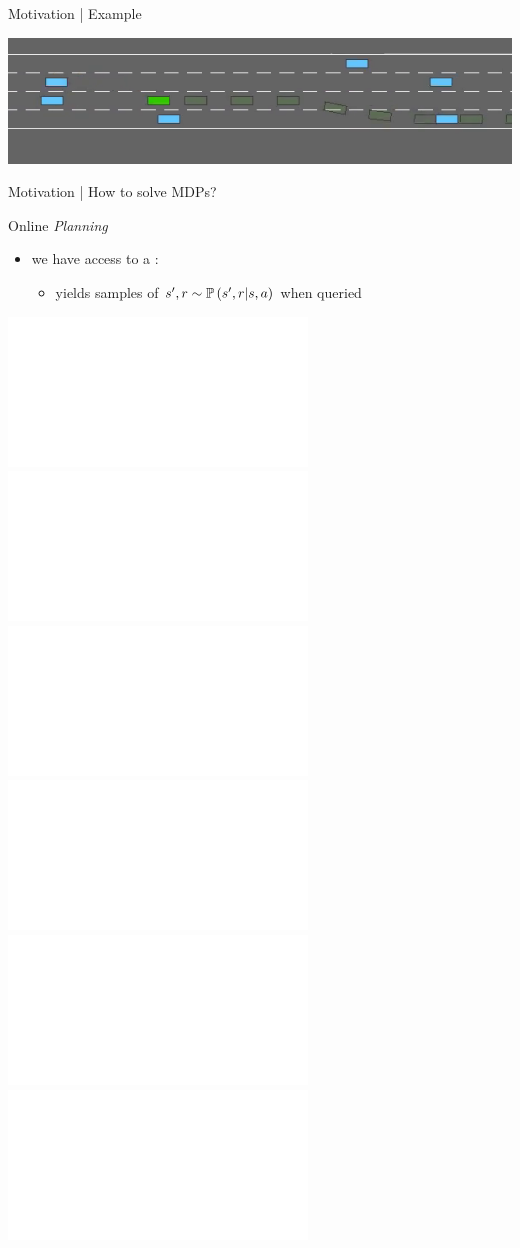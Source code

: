\documentclass{beamer}
\newcommand{\vcenteredinclude}[2]{\begingroup
\setbox0=\hbox{}%
\parbox{\wd0}{\box0}\endgroup}
\begin{document}
\begin{frame}{Motivation | Example}
\begin{center}
    \includegraphics[width=\linewidth]{img/highway-env}
\end{center}
\end{frame}

\begin{frame}{Motivation | How to solve MDPs?}
\begin{exampleblock}{Online \emph{Planning}}
\begin{itemize}
    \item we have access to a : 
    \begin{itemize}
        \item[\incarrow] yields samples of $s', r \sim \mathbb{P}\left(s',r|s,a\right)$ when queried
    \end{itemize}
\end{itemize}
\begin{center}
    \includegraphics<1>[trim=0 25 0 50,clip, width=0.7\linewidth]{img/diagram2.pdf}
    \includegraphics<2>[trim=0 25 0 50,clip, width=0.7\linewidth]{img/diagram3.pdf}
    \includegraphics<3>[trim=0 25 0 50,clip, width=0.7\linewidth]{img/diagram4.pdf}
    \includegraphics<4>[trim=0 25 0 50,clip, width=0.7\linewidth]{img/diagram5.pdf}
    \includegraphics<5>[trim=0 25 0 50,clip, width=0.7\linewidth]{img/diagram6.pdf}
    \includegraphics<6>[trim=0 25 0 50,clip, width=0.7\linewidth]{img/diagram7.pdf}
\end{center}
\end{exampleblock}
\end{frame}
\end{document}
